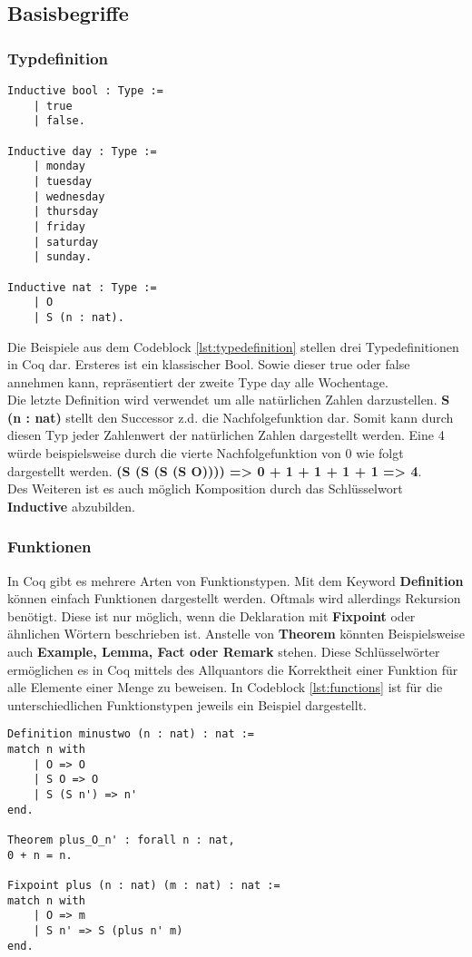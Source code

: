 \subsection{Basisbegriffe}
\subsubsection{Typdefinition}
\begin{lstlisting}[language=coq,firstnumber=1,caption=Coq Typedefinition,label=lst:typedefinition]
Inductive bool : Type :=
	| true
	| false.
	
Inductive day : Type :=
	| monday
	| tuesday
	| wednesday
	| thursday
	| friday
	| saturday
	| sunday.
	
Inductive nat : Type :=
	| O
	| S (n : nat).
\end{lstlisting}

Die Beispiele aus dem Codeblock \ref{lst:typedefinition} stellen drei Typedefinitionen in Coq dar. Ersteres ist ein klassischer Bool. Sowie dieser true oder false annehmen kann, repräsentiert der zweite Type day alle Wochentage. \\
Die letzte Definition wird verwendet um alle natürlichen Zahlen darzustellen. \textbf{S (n : nat)} stellt den Successor z.d. die Nachfolgefunktion dar. Somit kann durch diesen Typ jeder Zahlenwert der natürlichen Zahlen dargestellt werden. Eine 4 würde beispielsweise durch die vierte Nachfolgefunktion von 0 wie folgt dargestellt werden. \textbf{(S (S (S (S O)))) => 0 + 1 + 1 + 1 + 1 => 4}.\\
Des Weiteren ist es auch möglich Komposition durch das Schlüsselwort \textbf{Inductive} abzubilden.

\subsubsection{Funktionen}
In Coq gibt es mehrere Arten von Funktionstypen. Mit dem Keyword \textbf{Definition} können einfach Funktionen dargestellt werden. Oftmals wird allerdings Rekursion benötigt. Diese ist nur möglich, wenn die Deklaration mit \textbf{Fixpoint} oder ähnlichen Wörtern beschrieben ist. Anstelle von \textbf{Theorem} könnten Beispielsweise auch \textbf{Example, Lemma, Fact oder Remark} stehen. Diese Schlüsselwörter ermöglichen es in Coq mittels des Allquantors die Korrektheit einer Funktion für alle Elemente einer Menge zu beweisen.
In Codeblock \ref{lst:functions} ist für die unterschiedlichen Funktionstypen jeweils ein Beispiel dargestellt.
\begin{lstlisting}[language=coq,firstnumber=1,caption=Coq Funktionen,label=lst:functions]
Definition minustwo (n : nat) : nat :=
match n with
	| O => O
	| S O => O
	| S (S n') => n'
end.

Theorem plus_O_n' : forall n : nat,
0 + n = n.

Fixpoint plus (n : nat) (m : nat) : nat :=
match n with
	| O => m
	| S n' => S (plus n' m)
end.
\end{lstlisting}

